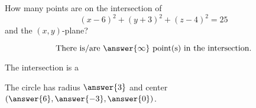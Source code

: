 \documentclass{ximera}
\author{Bart Snapp}
\begin{document}
\begin{exercise}
  How many points are on the intersection of
  \[
  (x-6)^2 + (y+3)^2 + (z-4)^2 = 25
  \]
  and the $(x,y)$-plane?
  \begin{prompt}
  \[
  \text{There is/are $\answer{\infty}$ point(s) in the intersection.}
  \]
  \end{prompt}
  \begin{exercise}
    The intersection is a
    \begin{multipleChoice}
    \end{multipleChoice}
    \begin{exercise}
    The circle has radius $\answer{3}$ and center
    $\left(\answer{6},\answer{-3},\answer{0}\right)$.
    \end{exercise}
  \end{exercise}
\end{exercise}
\end{document}
